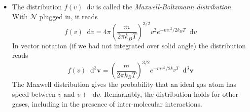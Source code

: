 \documentclass[11pt, a4paper]{article}
\newcommand{\diff}{\mathop{}\!\mathrm{d}} %
\begin{document}
\begin{itemize}
	\item The distribution $ f(v) \diff v $ is called the \textit{Maxwell-Boltzmann distribution}. With $ \mathcal{N} $ plugged in, it reads
	\begin{equation*}
		f(v) \diff v = 4\pi \left(\frac{m}{2\pi k_{B}T} \right)^{3/2} v^{2} e^{-mv^{2}/2k_{B}T} \diff v
	\end{equation*}
	In vector notation (if we had not integrated over solid angle) the distribution reads
	\begin{equation*}
		f(v) \diff^{3} \bm{v} = \left(\frac{m}{2\pi k_{B}T} \right)^{3/2} e^{-mv^{2}/2k_{B}T} \diff^{3} \bm{v}
	\end{equation*}
	The Maxwell distribution gives the probability that an ideal gas atom has speed between $ v $ and $ v + \diff v $. Remarkably, the distribution holds for other gases, including in the presence of inter-molecular interactions.
	
\end{itemize}
\end{document}
